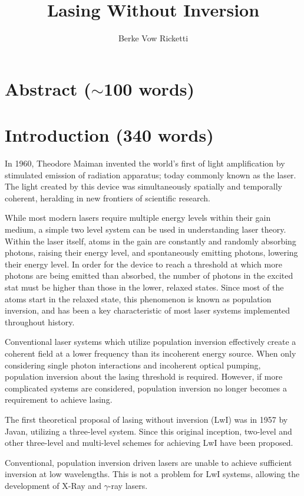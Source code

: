 \documentclass{article}
\title{Lasing Without Inversion}
\author{Berke Vow Ricketti}
\begin{document}
\maketitle{}




\section{Abstract ($\sim$100 words)}

\section{Introduction (340 words)}

In 1960, Theodore Maiman invented the world's first of light amplification by stimulated emission of radiation apparatus; today commonly known as the laser. The light created by this device was simultaneously spatially and temporally coherent, heralding in new frontiers of scientific research. 

While most modern lasers require multiple energy levels within their gain medium, a simple two level system can be used in understanding laser theory. Within the laser itself, atoms in the gain are constantly and randomly absorbing photons, raising their energy level, and spontaneously emitting photons, lowering their energy level. In order for the device to reach a threshold at which more photons are being emitted than absorbed, the number of photons in the excited stat must be higher than those in the lower, relaxed states. Since most of the atoms start in the relaxed state, this phenomenon is known as population inversion, and has been a key characteristic of most laser systems implemented throughout history.

Conventional laser systems which utilize population inversion effectively create a coherent field at a lower frequency than its incoherent energy source. When only considering single photon interactions and incoherent optical pumping, population inversion about the lasing threshold is required. However, if more complicated systems are considered, population inversion no longer becomes a requirement to achieve lasing.

The first theoretical proposal of lasing without inversion (LwI) was in 1957 by Javan, utilizing a three-level system. Since this original inception, two-level and other three-level and multi-level schemes for achieving LwI have been proposed.

Conventional, population inversion driven lasers are unable to achieve sufficient inversion at low wavelengths. This is not a problem for LwI systems, allowing the development of X-Ray and $\gamma$-ray lasers.
\end{document}
